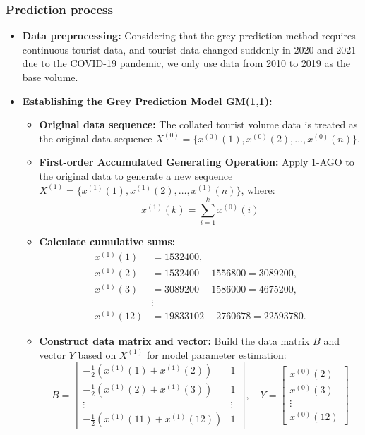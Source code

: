 \documentclass{mcmthesis}
\begin{document}
\subsubsection*{Prediction process}
\begin{itemize}
  \item \textbf{Data preprocessing:} Considering that the grey prediction method requires continuous tourist data, and tourist data changed suddenly in 2020 and 2021 due to the COVID-19 pandemic, we only use data from 2010 to 2019 as the base volume.
  \item \textbf{Establishing the Grey Prediction Model GM(1,1):}
  \begin{itemize}
    \item \textbf{Original data sequence:} The collated tourist volume data is treated as the original data sequence \( X^{(0)} = \{x^{(0)}(1), x^{(0)}(2), \ldots, x^{(0)}(n)\} \).
    \item \textbf{First-order Accumulated Generating Operation:} Apply 1-AGO to the original data to generate a new sequence \( X^{(1)} = \{x^{(1)}(1), x^{(1)}(2), \ldots, x^{(1)}(n)\} \), where:
    $$x^{(1)}(k) = \sum_{i=1}^{k} x^{(0)}(i) $$  
    \item \textbf{Calculate cumulative sums:}\[
\begin{aligned}
x^{(1)}(1) &= 1532400, \\
x^{(1)}(2) &= 1532400 + 1556800 = 3089200, \\
x^{(1)}(3) &= 3089200 + 1586000 = 4675200, \\
&\vdots \\
x^{(1)}(12) &= 19833102 + 2760678 = 22593780.
\end{aligned}
\]
\item \textbf{Construct data matrix and vector:} Build the data matrix \( B \) and vector \( Y \) based on \( X^{(1)} \) for model parameter estimation:
\[
B = \begin{bmatrix}
-\frac{1}{2}\left(x^{(1)}(1) + x^{(1)}(2)\right) & 1 \\
-\frac{1}{2}\left(x^{(1)}(2) + x^{(1)}(3)\right) & 1 \\
\vdots & \vdots \\
-\frac{1}{2}\left(x^{(1)}(11) + x^{(1)}(12)\right) & 1
\end{bmatrix}, \quad 
Y = \begin{bmatrix}
x^{(0)}(2) \\
x^{(0)}(3) \\
\vdots \\
x^{(0)}(12)

\end{bmatrix}\]
\end{itemize}
\end{itemize}
\end{document}

